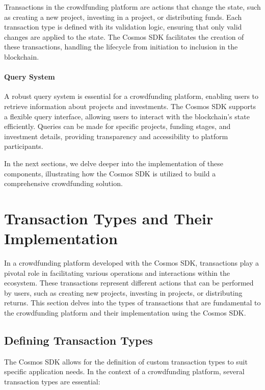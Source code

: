 Transactions in the crowdfunding platform are actions that change the state, such as creating a new project, investing in a project, or distributing funds. Each transaction type is defined with its validation logic, ensuring that only valid changes are applied to the state. The Cosmos SDK facilitates the creation of these transactions, handling the lifecycle from initiation to inclusion in the blockchain.

\paragraph{Query System}
\label{par:query-system}

A robust query system is essential for a crowdfunding platform, enabling users to retrieve information about projects and investments. The Cosmos SDK supports a flexible query interface, allowing users to interact with the blockchain's state efficiently. Queries can be made for specific projects, funding stages, and investment details, providing transparency and accessibility to platform participants.

In the next sections, we delve deeper into the implementation of these components, illustrating how the Cosmos SDK is utilized to build a comprehensive crowdfunding solution.

\section{Transaction Types and Their Implementation}
\label{sec:transaction-types-implementation}

In a crowdfunding platform developed with the Cosmos SDK, transactions play a pivotal role in facilitating various operations and interactions within the ecosystem. These transactions represent different actions that can be performed by users, such as creating new projects, investing in projects, or distributing returns. This section delves into the types of transactions that are fundamental to the crowdfunding platform and their implementation using the Cosmos SDK.

\subsection{Defining Transaction Types}
\label{subsec:defining-transaction-types}

The Cosmos SDK allows for the definition of custom transaction types to suit specific application needs. In the context of a crowdfunding platform, several transaction types are essential:

